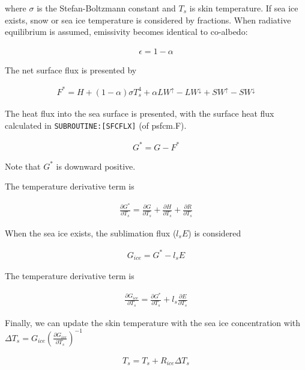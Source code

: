 where \(\sigma\) is the Stefan-Boltzmann constant and \(T_s\) is skin
temperature. If sea ice exists, snow or sea ice temperature is
considered by fractions. When radiative equilibrium is assumed,
emissivity becomes identical to co-albedo:

\begin{eqnarray}
    \epsilon = 1 - \alpha
\end{eqnarray}

The net surface flux is presented by

\begin{eqnarray}
    F^*=H + (1-\alpha)\sigma T_s^4 + \alpha LW^\uparrow - LW^\downarrow +SW^\uparrow - SW^\downarrow        
\end{eqnarray}

The heat flux into the sea surface is presented, with the surface heat
flux calculated in \texttt{SUBROUTINE:{[}SFCFLX{]}} (of psfcm.F).

\begin{eqnarray}
    G^* = G - F^*
\end{eqnarray}

Note that \(G^*\) is downward positive.

The temperature derivative term is

\begin{eqnarray}
    \frac{\partial G^*}{\partial T_s} = \frac{\partial G}{\partial T_s}+\frac{\partial H}{\partial T_s}+\frac{\partial R}{\partial T_s}
\end{eqnarray}

When the sea ice exists, the sublimation flux (\(l_s E\)) is considered

\begin{eqnarray}
    G_{ice} = G^* - l_s E
\end{eqnarray}

The temperature derivative term is

\begin{eqnarray}
    \frac{\partial G_{ice}}{\partial T_s}=\frac{\partial G^*}{\partial T_s} + l_s\frac{\partial E}{\partial T_s}
\end{eqnarray}

Finally, we can update the skin temperature with the sea ice
concentration with
\(\Delta T_s=G_{ice} ( \frac{\partial G_{ice}}{\partial T_s})^{-1}\)

\begin{eqnarray}
    T_s = T_s +R_{ice} \Delta T_s
\end{eqnarray}

